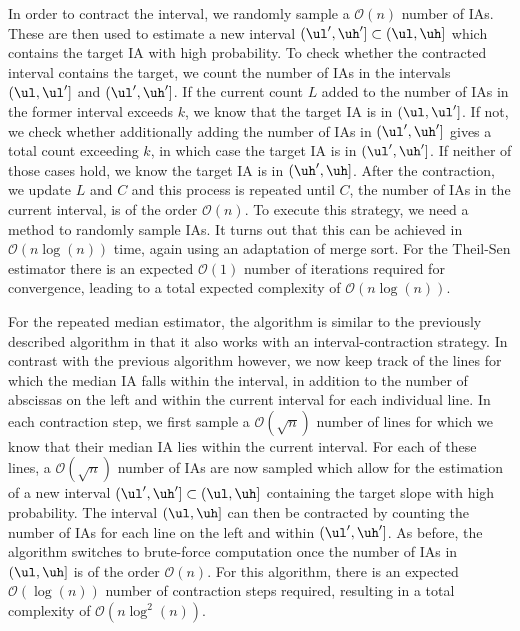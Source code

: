 In order to contract the interval, we randomly sample a $\mathcal{O}(n)$ number of IAs. These are then used to estimate a new interval $(\ul',\uh']\subset (\ul,\uh]$ which contains the target IA with high probability. To check whether the contracted interval contains the target, we count the number of IAs in the intervals $(\ul, \ul']$ and $(\ul',\uh']$. If the current count $L$ added to the number of IAs in the former interval exceeds $k$, we know that the target IA is in $(\ul, \ul']$. If not, we check whether additionally adding the number of IAs in $(\ul',\uh']$ gives a total count exceeding $k$, in which case the target IA is in $(\ul', \uh']$. If neither of those cases hold, we know the target IA is in $(\uh', \uh]$. After the contraction, we update $L$ and $C$ and this process is repeated until $C$, the number of IAs in the current interval, is of the order $\mathcal{O}(n)$. To execute this strategy, we need a method to randomly sample IAs. It turns out that this can be achieved in $\mathcal{O}(n\log(n))$ time, again using an adaptation of merge sort. For the Theil-Sen estimator there is an expected $\mathcal{O}(1)$ number of iterations required for convergence, leading to a total expected complexity of $\mathcal{O}(n\log(n))$.\par
For the repeated median estimator, the algorithm is similar to the previously described algorithm in that it also works with an interval-contraction strategy.
In contrast with the previous algorithm however, we now keep track of the lines for which the median IA falls within the interval, in addition to the number of abscissas on the left and within the current interval for each individual line. In each contraction step, we first sample a $\mathcal{O}(\sqrt{n})$ number of lines for which we know that their median IA lies within the current interval. For each of these lines, a $\mathcal{O}(\sqrt{n})$ number of IAs are now sampled which allow for the estimation of a new interval $(\ul',\uh']\subset (\ul,\uh]$ containing the target slope with high probability. The interval $(\ul,\uh]$ can then be contracted by counting the number of IAs for each line on the left and within $(\ul',\uh']$. As before, the algorithm switches to brute-force computation once the number of IAs in $(\ul,\uh]$ is of the order $\mathcal{O}(n)$.  For this algorithm, there is an expected $\mathcal{O}(\log(n))$ number of contraction steps required, resulting in a total complexity of  $\mathcal{O}(n\log^2(n))$.



